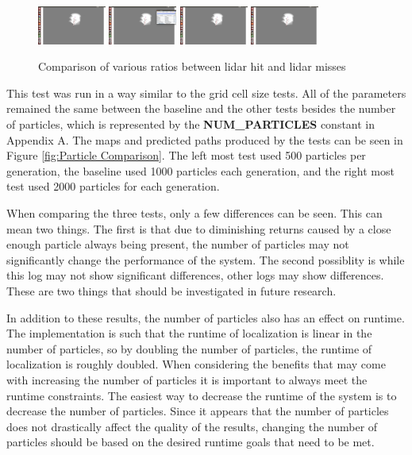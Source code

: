 \documentclass[10pt]{IEEEtran}
\begin{document}
\begin{figure}[t]
\centering
		\includegraphics[trim={25cm 15cm 20cm 7cm}, clip, width=0.2\textwidth]{Figures/ratio0:1}
		\includegraphics[trim={25cm 15cm 20cm 7cm}, clip, width=0.2\textwidth]{Figures/baseline1}
		\includegraphics[trim={25cm 15cm 20cm 7cm}, clip, width=0.2\textwidth]{Figures/ratio1:1}
		\includegraphics[trim={25cm 15cm 20cm 7cm}, clip, width=0.2\textwidth]{Figures/ratio1:0}
	\caption{Comparison of various ratios between lidar hit and lidar misses}
	\label{fig:Lidar Comparison}
\end{figure}

This test was run in a way similar to the grid cell size tests.  All of the parameters 
remained the same between the baseline and the other tests besides the number of particles,
which is represented by the \textbf{NUM\_PARTICLES} constant in Appendix A.
The maps and predicted paths produced by the tests can be seen in Figure 
\ref{fig:Particle Comparison}.  The left most test used 500 particles per generation,
the baseline used
1000 particles each generation, and the right most test used 2000 particles for each 
generation.

When comparing the three tests, only a few differences can be seen.  This can mean
two things.  The first is that due to diminishing returns caused by a close enough particle
always being present, the number of particles may not significantly change the performance 
of the system.  The second possiblity is while this log may not show
significant differences, other logs may show differences.  These are two things that should
be investigated in future research.

In addition to these results, the number of particles also has an effect on runtime.  The 
implementation is such that the runtime of localization is linear in the number of particles,
so by doubling the number of particles, the runtime of localization is roughly
doubled.  When considering the benefits that may come with increasing the number of particles
it is important to always meet the runtime constraints.  The easiest way to decrease 
the runtime of the system is to decrease the number of particles. Since it appears
that the number of particles does not drastically affect the quality of the results, changing
the number of particles should be based on the desired runtime goals that need to be met.
\end{document}
